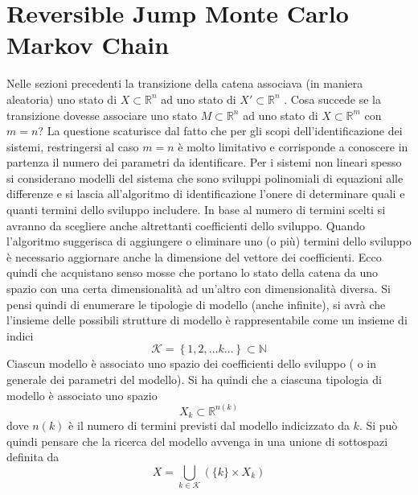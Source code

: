 \chapter{Reversible Jump Monte Carlo Markov Chain}
Nelle sezioni precedenti la transizione della catena associava (in maniera aleatoria)
uno stato di $X\subset \mathbb{R}^n$ ad uno stato di  $X'\subset \mathbb{R}^n$ .
Cosa succede se la transizione dovesse associare uno stato $M\subset \mathbb{R}^n$ ad uno stato
di $X\subset \mathbb{R}^m$ con $ m = n$?
La questione scaturisce dal fatto che per gli scopi dell’identificazione dei sistemi,
restringersi al caso $m = n$ è molto limitativo e corrisponde a conoscere in partenza
il numero dei parametri da identificare.
Per i sistemi non lineari spesso si considerano modelli del sistema che sono sviluppi
polinomiali di equazioni alle differenze e si lascia all’algoritmo di identificazione
l’onere di determinare quali e quanti termini dello sviluppo includere.
In base al numero di termini scelti si avranno da scegliere anche altrettanti coefficienti dello sviluppo.
Quando l’algoritmo suggerisca di aggiungere o eliminare uno (o più) termini dello
sviluppo è necessario aggiornare anche la dimensione del vettore dei coefficienti.
Ecco quindi che acquistano senso mosse che portano lo stato della catena da uno
spazio con una certa dimensionalità ad un’altro con dimensionalità diversa.
Si pensi quindi di enumerare le tipologie di modello (anche infinite), si avrà che
l’insieme delle possibili strutture di modello è rappresentabile come un insieme di
indici
\begin{equation*}
\mathcal{K}=\left\lbrace 1,2,\dots k \dots\right\rbrace \subset \mathbb{N}
\end{equation*}
Ciascun modello è associato uno spazio dei coefficienti dello sviluppo ( o in generale
dei parametri del modello).
Si ha quindi che a ciascuna tipologia di modello è associato uno spazio 
\begin{equation*}
X_k\subset\mathbb{R}^{n(k)}
\end{equation*} 
dove $n(k)$ è il numero di termini previsti dal modello indicizzato da $k$.
Si può quindi pensare che la ricerca del modello avvenga in una unione di sottospazi
definita da
\begin{equation}
X=\bigcup_{k\in \mathcal{K}}(\{k\}\times X_k)
\end{equation}

